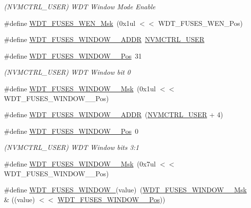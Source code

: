 \begin{DoxyCompactItemize}
\begin{DoxyCompactList}\small\item\em (N\+V\+M\+C\+T\+R\+L\+\_\+\+U\+S\+ER) W\+DT Window Mode Enable \end{DoxyCompactList}\item 
\#define \mbox{\hyperlink{group__fuses__api_gad6114332dfc7f6b0dd36326af632aa9d}{W\+D\+T\+\_\+\+F\+U\+S\+E\+S\+\_\+\+W\+E\+N\+\_\+\+Msk}}~(0x1ul $<$$<$ W\+D\+T\+\_\+\+F\+U\+S\+E\+S\+\_\+\+W\+E\+N\+\_\+\+Pos)
\item 
\#define \mbox{\hyperlink{group__fuses__api_gab779c4810b89e87904823d1c39c92023}{W\+D\+T\+\_\+\+F\+U\+S\+E\+S\+\_\+\+W\+I\+N\+D\+O\+W\+\_\+\_\+\+A\+D\+DR}}~\mbox{\hyperlink{group___s_a_m_d21_j18_a__base_ga7a7a83a5753fa323b61536e396083c99}{N\+V\+M\+C\+T\+R\+L\+\_\+\+U\+S\+ER}}
\item 
\#define \mbox{\hyperlink{group__fuses__api_ga6be021299139a6dcbc80f2b8921afab8}{W\+D\+T\+\_\+\+F\+U\+S\+E\+S\+\_\+\+W\+I\+N\+D\+O\+W\+\_\+\_\+\+Pos}}~31
\begin{DoxyCompactList}\small\item\em (N\+V\+M\+C\+T\+R\+L\+\_\+\+U\+S\+ER) W\+DT Window bit 0 \end{DoxyCompactList}\item 
\#define \mbox{\hyperlink{group__fuses__api_ga37e433bf27dd1905d83d6c32a7597eb2}{W\+D\+T\+\_\+\+F\+U\+S\+E\+S\+\_\+\+W\+I\+N\+D\+O\+W\+\_\+\_\+\+Msk}}~(0x1ul $<$$<$ W\+D\+T\+\_\+\+F\+U\+S\+E\+S\+\_\+\+W\+I\+N\+D\+O\+W\+\_\+\_\+\+Pos)
\item 
\#define \mbox{\hyperlink{group__fuses__api_ga099b07c0c8496b371f1d3796a2afc28a}{W\+D\+T\+\_\+\+F\+U\+S\+E\+S\+\_\+\+W\+I\+N\+D\+O\+W\+\_\+\_\+\+A\+D\+DR}}~(\mbox{\hyperlink{group___s_a_m_d21_j18_a__base_ga7a7a83a5753fa323b61536e396083c99}{N\+V\+M\+C\+T\+R\+L\+\_\+\+U\+S\+ER}} + 4)
\item 
\#define \mbox{\hyperlink{group__fuses__api_ga6415817cbbb76773225a7e0ac54b6f80}{W\+D\+T\+\_\+\+F\+U\+S\+E\+S\+\_\+\+W\+I\+N\+D\+O\+W\+\_\+\_\+\+Pos}}~0
\begin{DoxyCompactList}\small\item\em (N\+V\+M\+C\+T\+R\+L\+\_\+\+U\+S\+ER) W\+DT Window bits 3\+:1 \end{DoxyCompactList}\item 
\#define \mbox{\hyperlink{group__fuses__api_ga6a142163c91fe087e0e8e445d849b220}{W\+D\+T\+\_\+\+F\+U\+S\+E\+S\+\_\+\+W\+I\+N\+D\+O\+W\+\_\+\_\+\+Msk}}~(0x7ul $<$$<$ W\+D\+T\+\_\+\+F\+U\+S\+E\+S\+\_\+\+W\+I\+N\+D\+O\+W\+\_\+\_\+\+Pos)
\item 
\#define \mbox{\hyperlink{group__fuses__api_ga4ee0d85de09c6cbf1a4fdb8c3eec9d9f}{W\+D\+T\+\_\+\+F\+U\+S\+E\+S\+\_\+\+W\+I\+N\+D\+O\+W\+\_}}(value)~(\mbox{\hyperlink{group__fuses__api_ga6a142163c91fe087e0e8e445d849b220}{W\+D\+T\+\_\+\+F\+U\+S\+E\+S\+\_\+\+W\+I\+N\+D\+O\+W\+\_\+\_\+\+Msk}} \& ((value) $<$$<$ \mbox{\hyperlink{group__fuses__api_ga6415817cbbb76773225a7e0ac54b6f80}{W\+D\+T\+\_\+\+F\+U\+S\+E\+S\+\_\+\+W\+I\+N\+D\+O\+W\+\_\+\_\+\+Pos}}))
\end{DoxyCompactItemize}


